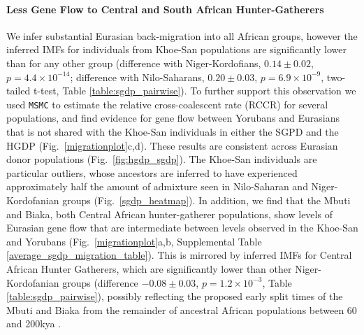 \paragraph{Less Gene Flow to Central and South African Hunter-Gatherers} We infer substantial Eurasian back-migration into all African groups, however the inferred IMFs for individuals from Khoe-San populations are significantly lower than for any other group (difference with Niger-Kordofians, $0.14 \pm 0.02$, $p = 4.4 \times 10^{-14}$; difference with Nilo-Saharans, $0.20 \pm 0.03$, $p = 6.9 \times 10^{-9}$, two-tailed t-test, Table \ref{table:sgdp_pairwise}). To further support this observation we used {\tt MSMC} to estimate the relative cross-coalescent rate (RCCR) for several populations, and find evidence for gene flow between Yorubans and Eurasians that is not shared with the Khoe-San individuals in either the SGPD and the HGDP (Fig.\ \ref{migrationplot}c,d). These results are consistent across Eurasian donor populations (Fig.\ \ref{fig:hgdp_sgdp}). The Khoe-San individuals are particular outliers, whose ancestors are inferred to have experienced approximately half the amount of admixture seen in Nilo-Saharan and Niger-Kordofanian groups (Fig.\ \ref{sgdp_heatmap}). 
In addition, we find that the Mbuti and Biaka, both Central African hunter-gatherer populations, show levels of Eurasian gene flow that are intermediate between levels observed in the Khoe-San and Yorubans (Fig.\ \ref{migrationplot}a,b, Supplemental Table \ref{average_sgdp_migration_table}).  This is mirrored by inferred IMFs for Central African Hunter Gatherers, which are significantly lower than other Niger-Kordofanian groups (difference $-0.08 \pm 0.03$, $p = 1.2 \times 10^{-3}$, Table \ref{table:sgdp_pairwise}), possibly reflecting the proposed early split times of the Mbuti and Biaka from the remainder of ancestral African populations between 60 and 200kya \cite{Patin2017, Lipson2019}. 

